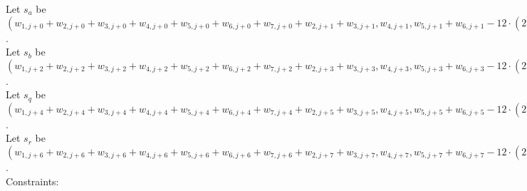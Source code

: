 Let $s_a$  be $(w_{1, j + 0} + w_{2, j + 0} + w_{3, j + 0} + w_{4, j + 0} + w_{5, j + 0} + w_{6, j + 0} + w_{7, j + 0} + w_{2, j + 1} + w_{3, j + 1}, w_{4, j + 1}, w_{5, j + 1} + w_{6, j + 1} - 12 \cdot (2^{20} - 1))$. \\
Let $s_b$  be $(w_{1, j + 2} + w_{2, j + 2} + w_{3, j + 2} + w_{4, j + 2} + w_{5, j + 2} + w_{6, j + 2} + w_{7, j + 2} + w_{2, j + 3} + w_{3, j + 3}, w_{4, j + 3}, w_{5, j + 3} + w_{6, j + 3} - 12 \cdot (2^{20} - 1))$. \\
Let $s_q$  be $(w_{1, j + 4} + w_{2, j + 4} + w_{3, j + 4} + w_{4, j + 4} + w_{5, j + 4} + w_{6, j + 4} + w_{7, j + 4} + w_{2, j + 5} + w_{3, j + 5}, w_{4, j + 5}, w_{5, j + 5} + w_{6, j + 5} - 12 \cdot (2^{20} - 1))$. \\
Let $s_r$  be $(w_{1, j + 6} + w_{2, j + 6} + w_{3, j + 6} + w_{4, j + 6} + w_{5, j + 6} + w_{6, j + 6} + w_{7, j + 6} + w_{2, j + 7} + w_{3, j + 7}, w_{4, j + 7}, w_{5, j + 7} + w_{6, j + 7} - 12 \cdot (2^{20} - 1))$. \\
Constraints:
